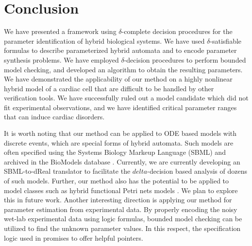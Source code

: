 \section{Conclusion}

We have presented a framework using $\delta$-complete decision procedures for the parameter identification 
of hybrid biological systems. We have used $\delta$-satisfiable formulas to describe parameterized hybrid automata 
and to encode parameter synthesis problems. We have employed $\delta$-decision procedures to perform bounded model 
checking, and developed an algorithm to obtain the resulting parameters.
We have demonstrated the applicability of our method on a highly nonlinear hybrid model of a cardiac cell that
are difficult to
be handled by other verification tools. We have successfully ruled out a model candidate which did not fit 
experimental observations, and we have identified critical parameter ranges that can induce cardiac disorders.

It is worth noting that our method can be applied to ODE based models with discrete events, which are special forms of hybrid automata. Such models are often specified using the Systems Biology Markeup Language (SBML) %
and archived in the BioModels database \cite{biomodels}. Currently, we are currently developing an SBML-to-dReal translator to facilitate the $delta$-decision based analysis of dozens of such models. 
Further, our method also has the potential to be applied to model classes such as hybrid functional Petri nets models \citep{hfpn}. We plan to explore this in future work. Another interesting direction is applying our method for parameter estimation from experimental data. By properly encoding the noisy wet-lab experimental data using logic formulas, bounded model checking can be utilized to find the unknown parameter values.
In this respect, the specification logic used in \cite{liu13} promises to offer helpful pointers.






